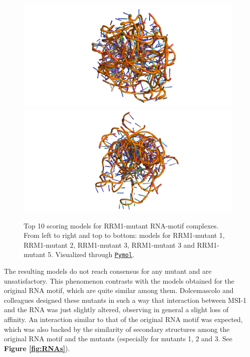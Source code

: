 \begin{figure}[htbp!]
    \endminipage\\
        \includegraphics[trim={6.5cm 0 6.5cm 0},clip,width=\linewidth]{assets/RMM1_mut4_ALL.png}
    \endminipage\hfill
        \includegraphics[trim={6.5cm 0 5.5cm 0},clip,width=\linewidth]{assets/RMM1_mut5_ALL.png}
    \endminipage
    \caption[Top 10 scoring models for RRM1-mutant RNA-motif complexes.]{Top 10 scoring models for RRM1-mutant RNA-motif complexes. From left to right and top to bottom: models for RRM1-mutant 1, RRM1-mutant 2, RRM1-mutant 3, RRM1-mutant 3 and RRM1-mutant 5. Visualized through \href{https://pymol.org/2/}{\texttt{Pymol}}.}
    \label{fig:RRMmuts}
\end{figure}

The resulting models do not reach consensus for any mutant and are unsatisfactory. This phenomenon contrasts with the models obtained for the original RNA motif, which are quite similar among them. Dolcemascolo and colleagues \cite{dolcemascolo_2022} designed these mutants in such a way that interaction between MSI-1 and the RNA was just slightly altered, observing in general a slight loss of affinity. An interaction similar to that of the original RNA motif was expected, which was also backed by the similarity of secondary structures among the original RNA motif and the mutants (especially for mutants 1, 2 and 3. See \textbf{Figure \ref{fig:RNAs}}).\\

